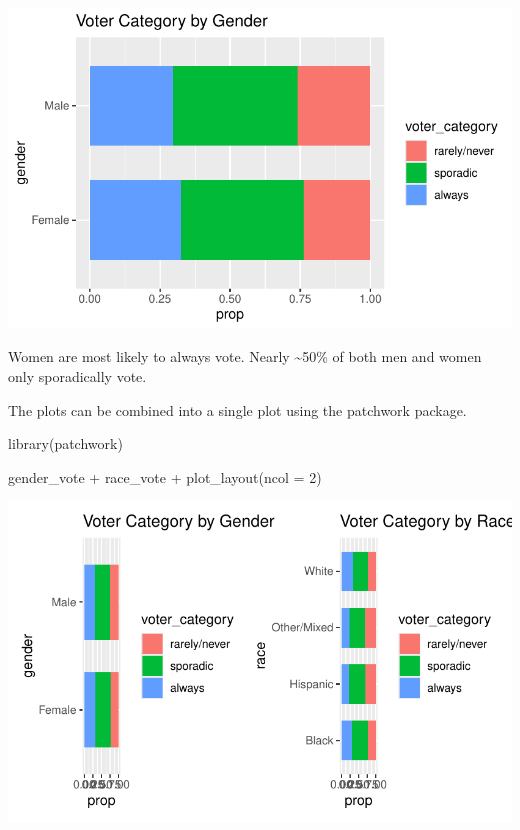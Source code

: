 \documentclass[
  letterpaper,
  DIV=11,
  numbers=noendperiod]{scrartcl}
\newenvironment{Shaded}{\begin{snugshade}}{\end{snugshade}}
\newcommand{\AttributeTok}[1]{\textcolor[rgb]{0.40,0.45,0.13}{#1}}
\newcommand{\DecValTok}[1]{\textcolor[rgb]{0.68,0.00,0.00}{#1}}
\newcommand{\FunctionTok}[1]{\textcolor[rgb]{0.28,0.35,0.67}{#1}}
\newcommand{\NormalTok}[1]{\textcolor[rgb]{0.00,0.23,0.31}{#1}}
\newcommand{\SpecialCharTok}[1]{\textcolor[rgb]{0.37,0.37,0.37}{#1}}
\begin{document}
\includegraphics{Lab4_multinom_Questions-1_files/figure-pdf/unnamed-chunk-7-1.pdf}

Women are most likely to always vote. Nearly \textasciitilde50\% of both
men and women only sporadically vote.

The plots can be combined into a single plot using the patchwork
package.

\begin{Shaded}
\begin{Highlighting}[]
\FunctionTok{library}\NormalTok{(patchwork)}

\NormalTok{gender\_vote }\SpecialCharTok{+}\NormalTok{ race\_vote }\SpecialCharTok{+} \FunctionTok{plot\_layout}\NormalTok{(}\AttributeTok{ncol =} \DecValTok{2}\NormalTok{)}
\end{Highlighting}
\end{Shaded}

\includegraphics{Lab4_multinom_Questions-1_files/figure-pdf/unnamed-chunk-8-1.pdf}
\end{document}
